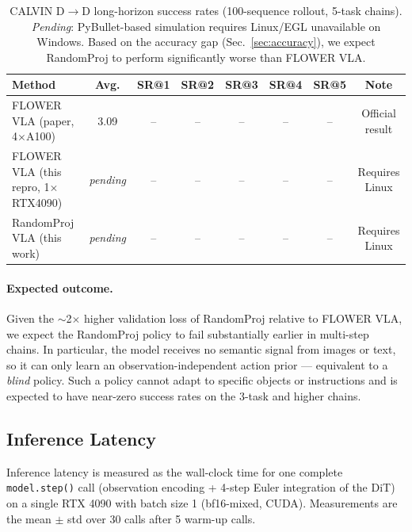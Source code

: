 \documentclass[11pt,a4paper]{article}
\begin{document}
\begin{table}[h]
\centering
{}
\begin{tabular}{lccccccc}
\toprule
\textbf{Method} & \textbf{Avg.} & \textbf{SR@1} & \textbf{SR@2} & \textbf{SR@3} & \textbf{SR@4} & \textbf{SR@5} & \textbf{Note} \\
\midrule
FLOWER VLA (paper, 4$\times$A100)~\cite{breuss2025flower} & 3.09 & -- & -- & -- & -- & -- & Official result \\
FLOWER VLA (this repro, 1$\times$RTX4090) & \textit{pending} & -- & -- & -- & -- & -- & Requires Linux \\
RandomProj VLA (this work)                & \textit{pending} & -- & -- & -- & -- & -- & Requires Linux \\
\bottomrule
\end{tabular}
\caption{CALVIN D$\rightarrow$D long-horizon success rates (100-sequence rollout, 5-task chains).
  \textit{Pending}: PyBullet-based simulation requires Linux/EGL unavailable on Windows.
  Based on the accuracy gap (Sec.~\ref{sec:accuracy}), we expect RandomProj to perform
  significantly worse than FLOWER VLA.}
\label{tab:calvin}
\end{table}

\paragraph{Expected outcome.}
Given the $\sim$2$\times$ higher validation loss of RandomProj relative to
FLOWER VLA, we expect the RandomProj policy to fail substantially earlier
in multi-step chains.  In particular, the model receives no semantic signal
from images or text, so it can only learn an observation-independent action
prior — equivalent to a \emph{blind} policy.  Such a policy cannot adapt to
specific objects or instructions and is expected to have near-zero success
rates on the 3-task and higher chains.

\subsection{Inference Latency}
\label{sec:latency}

Inference latency is measured as the wall-clock time for one complete
\texttt{model.step()} call (observation encoding + 4-step Euler integration
of the DiT) on a single RTX 4090 with batch size 1 (bf16-mixed, CUDA).
Measurements are the mean $\pm$ std over 30 calls after 5 warm-up calls.
\end{document}
